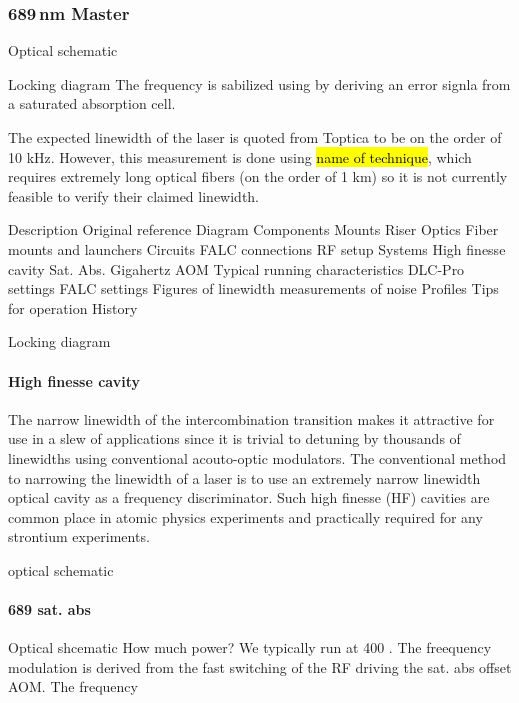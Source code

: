 \subsubsection{689\,nm Master}

Optical schematic


Locking diagram
The frequency is sabilized using by deriving an error signla from a saturated absorption cell.


The expected linewidth of the laser is quoted from Toptica to be on the order of 10 kHz.
However, this measurement is done using \hl{name of technique}, which requires extremely long optical fibers (on the order of 1 km) so it is not currently feasible to verify their claimed linewidth.

Description
	Original reference
Diagram
Components
	Mounts
		Riser
	Optics
		Fiber mounts and launchers
	Circuits
		FALC connections
		RF setup
	Systems
		High finesse cavity
		Sat. Abs. 
		Gigahertz AOM
Typical running characteristics
	DLC-Pro settings
	FALC settings
		Figures of linewidth
		measurements of noise
Profiles
Tips for operation
History


Locking diagram

\paragraph{High finesse cavity}
The narrow linewidth of the intercombination transition makes it attractive for use in a slew of applications since it is trivial to detuning by thousands of linewidths using conventional acouto-optic modulators.
The conventional method to narrowing the linewidth of a laser is to use an extremely narrow linewidth optical cavity as a frequency discriminator.
Such high finesse (HF) cavities are common place in atomic physics experiments and practically required for any strontium experiments.

optical schematic


\paragraph{689 sat. abs}
Optical shcematic
How much power?
We typically run at 400 \degree.
The freequency modulation is derived from the fast switching of the RF driving the sat. abs offset AOM.
The frequency

